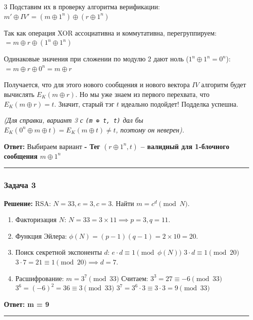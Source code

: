 ﻿\documentclass[9pt,a4paper,landscape]{extarticle}
\newcommand{\tightlist}{}
\begin{document}
\begin{multicols*}{3}
Подставим их в проверку алгоритма верификации: \(m' \oplus IV' = (m \oplus 1^n) \oplus (r \oplus 1^n)\)

Так как операция XOR ассоциативна и коммутативна, перегруппируем: \(= m \oplus r \oplus (1^n \oplus 1^n)\)

Одинаковые значения при сложении по модулю 2 дают ноль (\(1^n \oplus 1^n = 0^n\)): \(= m \oplus r \oplus 0^n = m \oplus r\)

Получается, что для этого нового сообщения и нового вектора \(IV\) алгоритм будет вычислять \(E_K(m \oplus r)\). Но мы уже знаем из первого перехвата, что \(E_K(m \oplus r) = t\). Значит, старый тэг \(t\) идеально подойдет! Подделка успешна.

\emph{(Для справки, вариант 3 с \texttt{(m\ ⊕\ t,\ t)} дал бы \(E_K(0^n \oplus m \oplus t) = E_K(m \oplus t) \neq t\), поэтому он неверен).}

\textbf{Ответ:} Выбираем вариант \textbf{- Тег \((r \oplus 1^n, t)\) -- валидный для 1-блочного сообщения \(m \oplus 1^n\)}

\begin{center}\rule{0.5\linewidth}{0.5pt}\end{center}

\subsubsection{Задача 3}\label{ux437ux430ux434ux430ux447ux430-3}

\textbf{Решение:} RSA: \(N=33, e=3, c=3\). Найти \(m = c^d \pmod N\).

\begin{enumerate}
\def\labelenumi{\arabic{enumi}.}
\tightlist
\item
  Факторизация \(N\): \(N = 33 = 3 \times 11 \implies p=3, q=11\).
\item
  Функция Эйлера: \(\phi(N) = (p-1)(q-1) = 2 \times 10 = 20\).
\item
  Поиск секретной экспоненты \(d\): \(e \cdot d \equiv 1 \pmod{\phi(N)}\) \(3 \cdot d \equiv 1 \pmod{20}\) \(3 \cdot 7 = 21 \equiv 1 \pmod{20} \implies d = 7\).
\item
  Расшифрование: \(m = 3^7 \pmod{33}\) Считаем: \(3^3 = 27 \equiv -6 \pmod{33}\) \(3^6 = (-6)^2 = 36 \equiv 3 \pmod{33}\) \(3^7 = 3^6 \cdot 3 \equiv 3 \cdot 3 = 9 \pmod{33}\)
\end{enumerate}

\textbf{Ответ: m = 9}

\begin{center}\rule{0.5\linewidth}{0.5pt}\end{center}


\end{multicols*}
\end{document}
